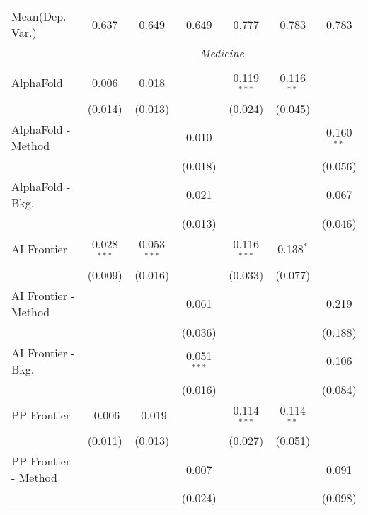 \begin{tabular}{lcccccc}
Mean(Dep. Var.) & 0.637 & 0.649 & 0.649 & 0.777 & 0.783 & 0.783 \\
 & \multicolumn{6}{c}{\textit{Medicine}} \\ \\
   AlphaFold            & 0.006         & 0.018         &               & 0.119$^{***}$ & 0.116$^{**}$ &   \\   
                        & (0.014)       & (0.013)       &               & (0.024)       & (0.045)      &   \\   
   AlphaFold - Method   &               &               & 0.010         &               &              & 0.160$^{**}$\\   
                        &               &               & (0.018)       &               &              & (0.056)\\   
   AlphaFold - Bkg.     &               &               & 0.021         &               &              & 0.067\\   
                        &               &               & (0.013)       &               &              & (0.046)\\   
   AI Frontier          & 0.028$^{***}$ & 0.053$^{***}$ &               & 0.116$^{***}$ & 0.138$^{*}$  &   \\   
                        & (0.009)       & (0.016)       &               & (0.033)       & (0.077)      &   \\   
   AI Frontier - Method &               &               & 0.061         &               &              & 0.219\\   
                        &               &               & (0.036)       &               &              & (0.188)\\   
   AI Frontier - Bkg.   &               &               & 0.051$^{***}$ &               &              & 0.106\\   
                        &               &               & (0.016)       &               &              & (0.084)\\   
   PP Frontier          & -0.006        & -0.019        &               & 0.114$^{***}$ & 0.114$^{**}$ &   \\   
                        & (0.011)       & (0.013)       &               & (0.027)       & (0.051)      &   \\   
   PP Frontier - Method &               &               & 0.007         &               &              & 0.091\\   
                        &               &               & (0.024)       &               &              & (0.098)\\   

\end{tabular}
